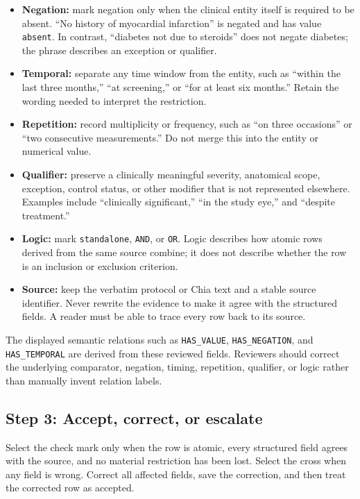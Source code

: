 \documentclass[11pt]{article}
\begin{document}
\begin{itemize}
    \item \textbf{Negation:} mark negation only when the clinical entity itself is required to be absent. ``No history of myocardial infarction'' is negated and has value \texttt{absent}. In contrast, ``diabetes not due to steroids'' does not negate diabetes; the phrase describes an exception or qualifier.

    \item \textbf{Temporal:} separate any time window from the entity, such as ``within the last three months,'' ``at screening,'' or ``for at least six months.'' Retain the wording needed to interpret the restriction.

    \item \textbf{Repetition:} record multiplicity or frequency, such as ``on three occasions'' or ``two consecutive measurements.'' Do not merge this into the entity or numerical value.

    \item \textbf{Qualifier:} preserve a clinically meaningful severity, anatomical scope, exception, control status, or other modifier that is not represented elsewhere. Examples include ``clinically significant,'' ``in the study eye,'' and ``despite treatment.''

    \item \textbf{Logic:} mark \texttt{standalone}, \texttt{AND}, or \texttt{OR}. Logic describes how atomic rows derived from the same source combine; it does not describe whether the row is an inclusion or exclusion criterion.

    \item \textbf{Source:} keep the verbatim protocol or Chia text and a stable source identifier. Never rewrite the evidence to make it agree with the structured fields. A reader must be able to trace every row back to its source.
\end{itemize}

The displayed semantic relations such as \texttt{HAS\_VALUE}, \texttt{HAS\_NEGATION}, and \texttt{HAS\_TEMPORAL} are derived from these reviewed fields. Reviewers should correct the underlying comparator, negation, timing, repetition, qualifier, or logic rather than manually invent relation labels.

\subsection{Step 3: Accept, correct, or escalate}

Select the check mark only when the row is atomic, every structured field agrees with the source, and no material restriction has been lost. Select the cross when any field is wrong. Correct all affected fields, save the correction, and then treat the corrected row as accepted.
\end{document}
